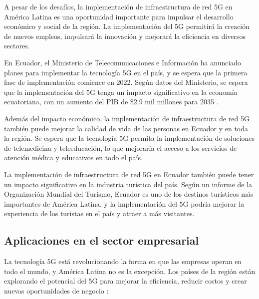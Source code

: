 \documentclass[12pt]{article}
\begin{document}
            A pesar de los desafíos, la implementación de infraestructura de red 5G en América Latina es una oportunidad importante para impulsar el desarrollo económico y social de la región. La implementación del 5G permitirá la creación de nuevos empleos, impulsará la innovación y mejorará la eficiencia en diversos sectores.
            
            En Ecuador, el Ministerio de Telecomunicaciones e Información ha anunciado planes para implementar la tecnología 5G en el país, y se espera que la primera fase de implementación comience en 2022. Según datos del Ministerio, se espera que la implementación del 5G tenga un impacto significativo en la economía ecuatoriana, con un aumento del PIB de \$2.9 mil millones para 2035 \cite{lopez2020el}.
            
            Además del impacto económico, la implementación de infraestructura de red 5G también puede mejorar la calidad de vida de las personas en Ecuador y en toda la región. Se espera que la tecnología 5G permita la implementación de soluciones de telemedicina y teleeducación, lo que mejoraría el acceso a los servicios de atención médica y educativos en todo el país.
            
            La implementación de infraestructura de red 5G en Ecuador también puede tener un impacto significativo en la industria turística del país. Según un informe de la Organización Mundial del Turismo, Ecuador es uno de los destinos turísticos más importantes de América Latina, y la implementación del 5G podría mejorar la experiencia de los turistas en el país y atraer a más visitantes\cite{haro2021perspectivas}.
            
        \subsection{Aplicaciones en el sector empresarial}

            La tecnología 5G está revolucionando la forma en que las empresas operan en todo el mundo, y América Latina no es la excepción. Los países de la región están explorando el potencial del 5G para mejorar la eficiencia, reducir costos y crear nuevas oportunidades de negocio \cite{garcia2018escenarios}:
\end{document}
